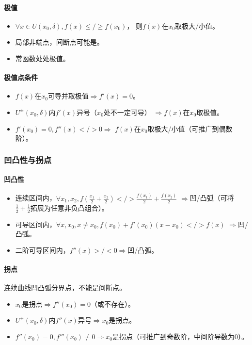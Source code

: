 \documentclass[
12pt, %
a4paper, 
oneside, %
headinclude,footinclude, %
]{scrartcl}
\begin{document}
\paragraph{极值}
\begin{itemize}
\item $ \forall x \in U(x_0, \delta), f(x) \leq/\geq f(x_0) $，
则$ f(x) $在$ x_0 $取极大/小值。
\item 局部非端点，间断点可能是。
\item 常函数处处极值。
\end{itemize}
\paragraph{极值点条件}
\begin{itemize}
\item $ f(x) $在$ x_0 $可导并取极值$ \Rightarrow $$ f'(x) = 0 $。
\item $ U^\pm (x_0, \delta) $内$ f'(x) $异号（$ x_0 $处不一定可导）
$ \Rightarrow $$ f(x) $在$ x_0 $取极值。
\item $ f'(x_0) = 0 , f''(x) </> 0 $$ \Rightarrow $
$ f(x) $在$ x_0 $取极大/小值（可推广到偶数阶）。
\end{itemize}
\subsubsection{凹凸性与拐点}
\paragraph{凹凸性}
\begin{itemize}
\item 连续区间内，$ \forall x_1,x_2, f(\frac{x_1}{2} + \frac{x_2}{2}) </> \frac{f(x_1)}{2} + \frac{f(x_2)}{2} $
$ \Rightarrow $凹/凸弧（可将$ \frac{1}{2} + \frac{1}{2} $拓展为任意非负凸组合）。
\item 可导区间内，$ \forall x,x_0, x \neq x_0, f(x_0) + f'(x_0) (x - x_0) </> f(x) $
$ \Rightarrow $凹/凸弧。
\item 二阶可导区间内，$ f''(x) >/< 0 $$ \Rightarrow $凹/凸弧。
\end{itemize}
\paragraph{拐点}
连续曲线凹凸弧分界点，不能是间断点。
\begin{itemize}
\item $ x_0 $是拐点$ \Rightarrow $$ f''(x_0) = 0 $（或不存在）。
\item $ U^{\pm}(x_0, \delta) $内$ f''(x) $异号$ \Rightarrow $$ x_0 $是拐点。
\item $ f''(x_0) = 0, f'''(x_0) \neq 0 $$ \Rightarrow $$ x_0 $是拐点（可推广到奇数阶，中间阶导数为$ 0 $）。
\end{itemize}
\end{document}

